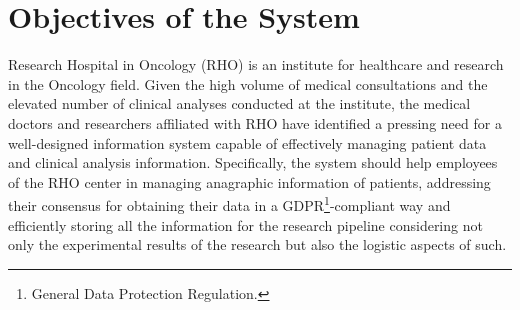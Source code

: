 \section{Objectives of the System}
Research Hospital in Oncology (RHO) is an institute for healthcare and research in the Oncology field. Given the high volume of medical consultations and the elevated number of clinical analyses conducted at the institute, the medical doctors and researchers affiliated with RHO have identified a pressing need for a well-designed information system capable of effectively managing patient data and clinical analysis information. Specifically, the system should help employees of the RHO center in managing anagraphic information of patients, addressing their consensus for obtaining their data in a GDPR\footnote{General Data Protection Regulation.}-compliant way and efficiently storing all the information for the research pipeline considering not only the experimental results of the research but also the logistic aspects of such.